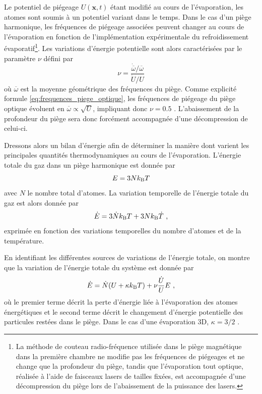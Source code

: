 Le potentiel de piégeage $U(\mathbf{x},t)$ étant modifié au cours de l'évaporation, les atomes sont soumis à un potentiel variant dans le temps. Dans le cas d'un piège harmonique, les fréquences de piégeage associées peuvent changer au cours de l'évaporation en fonction de l'implémentation expérimentale du refroidissement évaporatif\footnote{La méthode de couteau radio-fréquence utilisée dans le piège magnétique dans la première chambre ne modifie pas les fréquences de piégeages et ne change que la profondeur du piège, tandis que l'évaporation tout optique, réalisée à l'aide de faisceaux lasers de tailles fixées, est accompagnée d'une décompression du piège lors de l'abaissement de la puissance des lasers.}. Les variations d'énergie potentielle sont alors caractérisées par le paramètre $\nu$ défini par
\begin{equation}
\nu=\frac{\dot{\overline{\omega}}/\overline{\omega}}{\dot{U}/U}
\end{equation}
où $\overline{\omega}$ est la moyenne géométrique des fréquences du piège. Comme explicité formule \ref{eq:frequences_piege_optique}, les fréquences de piégeage du piège optique évoluent en $\overline{\omega}\propto\sqrt{U}$, impliquant donc $\nu=0.5$ \citep{o2001scaling}. L'abaissement de la profondeur du piège sera donc forcément accompagnée d'une décompression de celui-ci. 




Dressons alors un bilan d'énergie afin de déterminer la manière dont varient les principales quantités thermodynamiques au cours de l'évaporation. L'énergie totale du gaz dans un piège harmonique est donnée par
\begin{equation}
E=3Nk_{\mathrm{B}} T
\end{equation}
avec $N$ le nombre total d'atomes. La variation temporelle de l'énergie totale du gaz est alors donnée par
\begin{equation}
\dot{E}=3\dot{N} k_{\mathrm{B}} T + 3 N k_{\mathrm{B}} \dot{T} \text{ ,}
\label{eq:variation_energie_derivee}
\end{equation}
exprimée en fonction des variations temporelles du nombre d'atomes et de la température.

En identifiant les différentes sources de variations de l'énergie totale, on montre que la variation de l'énergie totale du système est donnée par \citep{cohen1996atomes}
\begin{equation}
\dot{E}=\dot{N}(U+\kappa k_{\mathrm{B}} T) +\nu\frac{\dot{U}}{U}E \text{ ,}
\label{eq:variation_energie_bilan}
\end{equation}
où le premier terme décrit la perte d'énergie liée à l'évaporation des atomes énergétiques et le second terme décrit le changement d'énergie potentielle des particules restées dans le piège. Dans le cas d'une évaporation 3D, $\kappa=3/2$ \citep{ketterle1996evaporative}.

